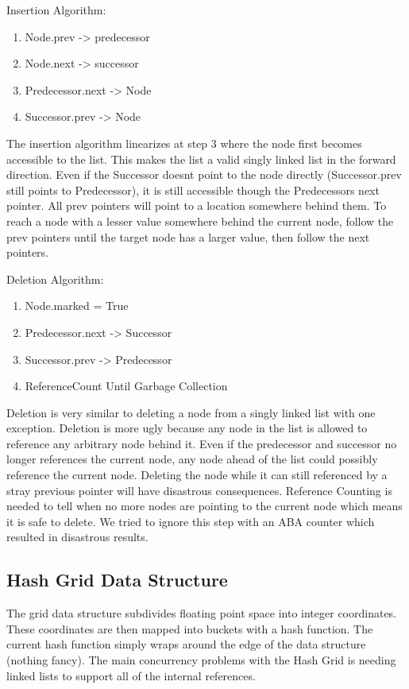 \documentclass[conference]{IEEEtran}
\begin{document}
Insertion Algorithm:
\begin{enumerate}
\item Node.prev -> predecessor
\item Node.next -> successor
\item Predecessor.next -> Node
\item Successor.prev -> Node
\end{enumerate} 


The insertion algorithm linearizes at step 3 where the node first becomes accessible to the list. This makes the list a valid singly linked list in the forward direction. Even if the Successor doesn\textquotesingle t point to the node directly (Successor.prev still points to Predecessor), it is still accessible though the Predecessor\textquotesingle s next pointer. All prev pointers will point to a location somewhere behind them. To reach a node with a lesser value somewhere behind the current node, follow the prev pointers until the target node has a larger value, then follow the next pointers.


Deletion Algorithm:
\begin{enumerate}
\item Node.marked = True
\item Predecessor.next -> Successor
\item Successor.prev -> Predecessor
\item ReferenceCount Until Garbage Collection
\end{enumerate} 

Deletion is very similar to deleting a node from a singly linked list with one exception. Deletion is more ugly because any node in the list is allowed to reference any arbitrary node behind it. Even if the predecessor and successor no longer references the current node, any node ahead of the list could possibly reference the current node. Deleting the node while it  can still referenced by a stray previous pointer will have disastrous consequences. Reference Counting is needed to tell when no more nodes are pointing to the current node which means it is safe to delete. We tried to ignore this step with an ABA counter which resulted in disastrous results.

	\subsection{Hash Grid Data Structure}
	The grid data structure subdivides floating point space into integer coordinates. These coordinates are then mapped into buckets with a hash function. The current hash function simply wraps around the edge of the data structure (nothing fancy). The main concurrency problems with the Hash Grid is needing linked lists to support all of the internal references.
\end{document}

